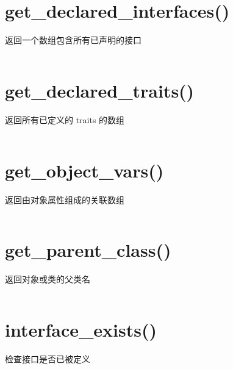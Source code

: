 \section{get\_declared\_interfaces()}

返回一个数组包含所有已声明的接口


\begin{lstlisting}[language=PHP]

\end{lstlisting}



\section{get\_declared\_traits()}

返回所有已定义的 traits 的数组


\begin{lstlisting}[language=PHP]

\end{lstlisting}


\section{get\_object\_vars()}

返回由对象属性组成的关联数组


\begin{lstlisting}[language=PHP]

\end{lstlisting}


\section{get\_parent\_class()}

返回对象或类的父类名


\begin{lstlisting}[language=PHP]

\end{lstlisting}


\section{interface\_exists()}

检查接口是否已被定义


\begin{lstlisting}[language=PHP]

\end{lstlisting}


